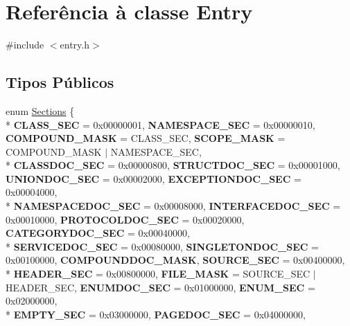 \hypertarget{class_entry}{\section{Referência à classe Entry}
\label{class_entry}
}


{\ttfamily \#include $<$entry.\-h$>$}

\subsection*{Tipos Públicos}
\begin{DoxyCompactItemize}
\item 
enum \hyperlink{class_entry_a6ff2d3555e17f89856c76b840772d461}{Sections} \{ \\*
{\bfseries C\-L\-A\-S\-S\-\_\-\-S\-E\-C} = 0x00000001, 
{\bfseries N\-A\-M\-E\-S\-P\-A\-C\-E\-\_\-\-S\-E\-C} = 0x00000010, 
{\bfseries C\-O\-M\-P\-O\-U\-N\-D\-\_\-\-M\-A\-S\-K} = C\-L\-A\-S\-S\-\_\-\-S\-E\-C, 
{\bfseries S\-C\-O\-P\-E\-\_\-\-M\-A\-S\-K} = C\-O\-M\-P\-O\-U\-N\-D\-\_\-\-M\-A\-S\-K $|$ N\-A\-M\-E\-S\-P\-A\-C\-E\-\_\-\-S\-E\-C, 
\\*
{\bfseries C\-L\-A\-S\-S\-D\-O\-C\-\_\-\-S\-E\-C} = 0x00000800, 
{\bfseries S\-T\-R\-U\-C\-T\-D\-O\-C\-\_\-\-S\-E\-C} = 0x00001000, 
{\bfseries U\-N\-I\-O\-N\-D\-O\-C\-\_\-\-S\-E\-C} = 0x00002000, 
{\bfseries E\-X\-C\-E\-P\-T\-I\-O\-N\-D\-O\-C\-\_\-\-S\-E\-C} = 0x00004000, 
\\*
{\bfseries N\-A\-M\-E\-S\-P\-A\-C\-E\-D\-O\-C\-\_\-\-S\-E\-C} = 0x00008000, 
{\bfseries I\-N\-T\-E\-R\-F\-A\-C\-E\-D\-O\-C\-\_\-\-S\-E\-C} = 0x00010000, 
{\bfseries P\-R\-O\-T\-O\-C\-O\-L\-D\-O\-C\-\_\-\-S\-E\-C} = 0x00020000, 
{\bfseries C\-A\-T\-E\-G\-O\-R\-Y\-D\-O\-C\-\_\-\-S\-E\-C} = 0x00040000, 
\\*
{\bfseries S\-E\-R\-V\-I\-C\-E\-D\-O\-C\-\_\-\-S\-E\-C} = 0x00080000, 
{\bfseries S\-I\-N\-G\-L\-E\-T\-O\-N\-D\-O\-C\-\_\-\-S\-E\-C} = 0x00100000, 
{\bfseries C\-O\-M\-P\-O\-U\-N\-D\-D\-O\-C\-\_\-\-M\-A\-S\-K}, 
{\bfseries S\-O\-U\-R\-C\-E\-\_\-\-S\-E\-C} = 0x00400000, 
\\*
{\bfseries H\-E\-A\-D\-E\-R\-\_\-\-S\-E\-C} = 0x00800000, 
{\bfseries F\-I\-L\-E\-\_\-\-M\-A\-S\-K} = S\-O\-U\-R\-C\-E\-\_\-\-S\-E\-C $|$ H\-E\-A\-D\-E\-R\-\_\-\-S\-E\-C, 
{\bfseries E\-N\-U\-M\-D\-O\-C\-\_\-\-S\-E\-C} = 0x01000000, 
{\bfseries E\-N\-U\-M\-\_\-\-S\-E\-C} = 0x02000000, 
\\*
{\bfseries E\-M\-P\-T\-Y\-\_\-\-S\-E\-C} = 0x03000000, 
{\bfseries P\-A\-G\-E\-D\-O\-C\-\_\-\-S\-E\-C} = 0x04000000, 

\end{DoxyCompactItemize}
